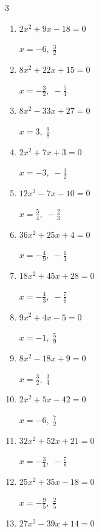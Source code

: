 \begin{multicols}{3}
\begin{enumerate}
  \item $2x^{2}+9x-18=0$

        $\displaystyle x=-6,\; \frac{3}{2}$

  \item $8x^{2}+22x+15=0$

        $\displaystyle x=-\frac{3}{2},\; -\frac{5}{4}$

\columnbreak %

\resetques

  \item $8x^{2}-33x+27=0$

        $\displaystyle x=3,\; \frac{9}{8}$

  \item $2x^{2}+7x+3=0$

        $\displaystyle x=-3,\; -\frac{1}{2}$

  \item $12x^{2}-7x-10=0$

        $\displaystyle x=\frac{5}{4},\; -\frac{2}{3}$

  \item $36x^{2}+25x+4=0$

        $\displaystyle x=-\frac{4}{9},\; -\frac{1}{4}$

  \item $18x^{2}+45x+28=0$

        $\displaystyle x=-\frac{4}{3},\; -\frac{7}{6}$

  \item $9x^{2}+4x-5=0$

        $\displaystyle x=-1,\; \frac{5}{9}$

  \item $8x^{2}-18x+9=0$

        $\displaystyle x=\frac{3}{2},\; \frac{3}{4}$

  \item $2x^{2}+5x-42=0$

        $\displaystyle x=-6,\; \frac{7}{2}$

  \item $32x^{2}+52x+21=0$

        $\displaystyle x=-\frac{3}{4},\; -\frac{7}{8}$

  \item $25x^{2}+35x-18=0$

        $\displaystyle x=-\frac{9}{5},\; \frac{2}{5}$

\columnbreak %

  \item $27x^{2}-39x+14=0$


\end{enumerate}
\end{multicols}
